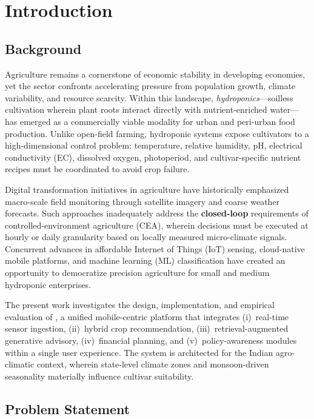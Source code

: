 \chapter{Introduction}
\label{ch:introduction}

\section{Background}
\label{sec:background}

Agriculture remains a cornerstone of economic stability in developing economies, yet the sector confronts accelerating pressure from population growth, climate variability, and resource scarcity. Within this landscape, \emph{hydroponics}---soilless cultivation wherein plant roots interact directly with nutrient-enriched water---has emerged as a commercially viable modality for urban and peri-urban food production. Unlike open-field farming, hydroponic systems expose cultivators to a high-dimensional control problem: temperature, relative humidity, pH, electrical conductivity (EC), dissolved oxygen, photoperiod, and cultivar-specific nutrient recipes must be coordinated to avoid crop failure.

Digital transformation initiatives in agriculture have historically emphasized macro-scale field monitoring through satellite imagery and coarse weather forecasts. Such approaches inadequately address the \textbf{closed-loop} requirements of controlled-environment agriculture (CEA), wherein decisions must be executed at hourly or daily granularity based on locally measured micro-climate signals. Concurrent advances in affordable Internet of Things (IoT) sensing, cloud-native mobile platforms, and machine learning (ML) classification have created an opportunity to democratize precision agriculture for small and medium hydroponic enterprises.

The present work investigates the design, implementation, and empirical evaluation of \HydroSmart, a unified mobile-centric platform that integrates (i)~real-time sensor ingestion, (ii)~hybrid crop recommendation, (iii)~retrieval-augmented generative advisory, (iv)~financial planning, and (v)~policy-awareness modules within a single user experience. The system is architected for the Indian agro-climatic context, wherein state-level climate zones and monsoon-driven seasonality materially influence cultivar suitability.

\section{Problem Statement}
\label{sec:problem}

